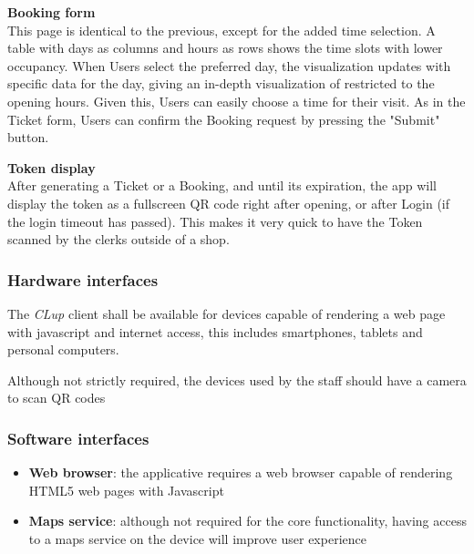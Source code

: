 \textbf{Booking form}\\
\label{page:booking_form}
This page is identical to the previous, except for the added time selection. A table with days as columns and hours as rows shows the time slots with lower occupancy. When Users select the preferred day, the visualization updates with specific data for the day, giving an in-depth visualization of restricted to the opening hours. Given this, Users can easily choose a time for their visit. As in the Ticket form, Users can confirm the Booking request by pressing the "Submit" button.

\textbf{Token display}\\
\label{page:token_show}
After generating a Ticket or a Booking, and until its expiration, the app will display the token as a fullscreen QR code right after opening, or after Login (if the login timeout has passed).
This makes it very quick to have the Token scanned by the clerks outside of a shop.

\subsubsection{Hardware interfaces}
The \emph{CLup} client shall be available for devices capable of rendering a web page with javascript and internet access, this includes smartphones, tablets and personal computers.

Although not strictly required, the devices used by the staff should have a camera to scan QR codes

\subsubsection{Software interfaces}
\begin{itemize}
    \item \textbf{Web browser}: the applicative requires a web browser capable of rendering HTML5 web pages with Javascript
    \item \textbf{Maps service}: although not required for the core functionality, having access to a maps service on the device will improve user experience
\end{itemize}

